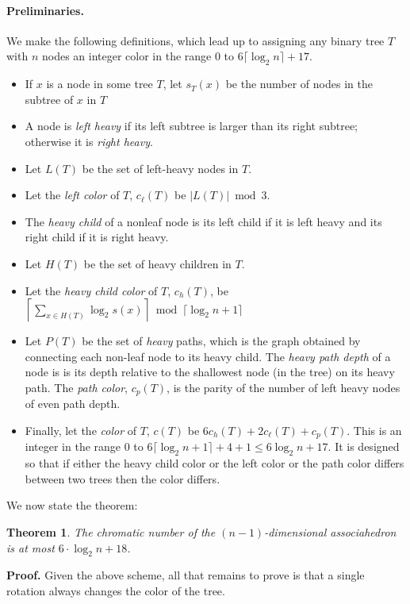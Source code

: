\documentclass[a4paper]{article}
\newtheorem{theorem}{Theorem}
\begin{document}
\paragraph{Preliminaries.} We make the following definitions, which lead up to assigning any binary tree $T$ with $n$ nodes an integer color in the range 0 to $6 \lceil \log_2 n \rceil +17$.

\begin{itemize}
    \item If $x$ is a node in some tree $T$, let $s_T(x)$ be the number of nodes in the subtree of $x$ in $T$
    \item A node is \emph{left heavy} if its left subtree is larger than its right subtree; otherwise it is \emph{right heavy}.
    \item Let $L(T)$ be the set of left-heavy nodes in $T$.
    \item Let the \emph{left color} of $T$, $c_\ell(T)$ be $|L(T)| \bmod 3$.
    \item The \emph{heavy child} of a nonleaf node is its left child if it is left heavy and its right child if it is right heavy.
    \item Let $H(T)$ be the set of heavy children in $T$.
    \item Let the \emph{heavy child color} of $T$, $c_h(T)$, be $\left\lceil  \sum_{x \in H(T)} \log_2 s(x) \right\rceil \bmod \lceil \log_2n+1 \rceil$
    \item Let $P(T)$ be the set of \emph{heavy} paths, which is the graph obtained by connecting each non-leaf node to its heavy child. The \emph{heavy path depth} of a node is is its depth relative to the shallowest node (in the tree) on its heavy path. The \emph{path color}, $c_p(T)$, is the parity of the number of left heavy nodes of even path depth. 
    \item Finally, let the \emph{color} of $T$, $c(T)$ be $6c_h(T)+2c_\ell(T)+c_p(T)$. This is an integer in the range 0 to $6 \lceil \log_2 n + 1 \rceil +4+1 \leq 6 \log_2n+17$. It is designed so that if either the heavy child color or the left color or the path color differs between two trees then the color differs.
\end{itemize}

We now state the theorem:

\begin{theorem}
The chromatic number of the $(n-1)$-dimensional associahedron is at most $6\cdot \log_2 n + 18$.
\end{theorem}
\textbf{Proof.} Given the above scheme, all that remains to prove is that a single rotation always changes the color of the tree.
\end{document}
